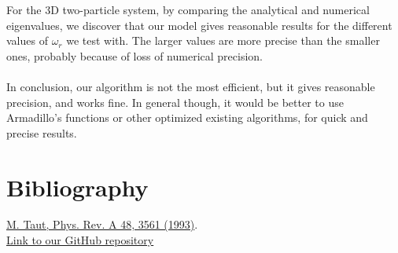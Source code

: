 \documentclass{article}
\begin{document}
	For the 3D two-particle system, by comparing the analytical and numerical eigenvalues, we discover that our model gives reasonable results for the different values of $\omega_r$ we test with. The larger values are more precise than the smaller ones, probably because of loss of numerical precision.\\\\

	In conclusion, our algorithm is not the most efficient, but it gives reasonable precision, and works fine. In general though, it would be better to use Armadillo's functions or other optimized existing algorithms, for quick and precise results.

\section{Bibliography}
	\href{http://prola.aps.org/abstract/PRA/v48/i5/p3561_1}{M. Taut, Phys. Rev. A 48, 3561 (1993)}.\\
	\href{https://github.com/emmernme/MENA-Compfys/tree/master/Project2}{Link to our GitHub repository}
\end{document}
